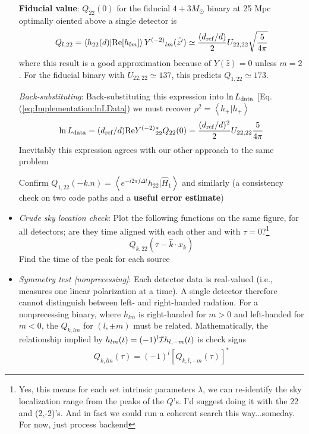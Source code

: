 \documentclass[twocolumn,prd,nofootinbib]{revtex4}
\newcommand\editremark[1]{{\color{red} #1}}
\newcommand\Y[1]{Y^{(#1)}{}}
\newcommand\qmstateproduct[2]{\left\langle#1|#2\right\rangle}
\begin{document}
\begin{widetext}
\begin{itemize}
\begin{shaded}
\noindent \textbf{Fiducial value}: $Q_{22}(0)$ for the fiducial $4+3 M_\odot$ binary at 25 Mpc optimally oiented above a
single detector is
 \begin{eqnarray}
 Q_{l,22} = \qmstateproduct{h_{22}(d)}{\text{Re}[h_{lm}]}\Y{-2}_{lm}(\hat{z'}) 
\simeq  \frac{(d_{\rm ref}/d)}{2}  U_{22,22} \sqrt{ \frac{5}{4\pi}}
 \end{eqnarray}
where this result is a good approximation because of $Y(\hat{z})=0$ unless $m=2$. For the fiducial binary with
$U_{22,22}\simeq 137$, this predicts $Q_{1,22}\simeq 173$.

\noindent \emph{Back-substituting}: Back-substituting this expression into $\ln L_{\rm data}$
          [Eq. (\ref{eq:Implementation:lnLData}) we must recover $\rho^2 = \qmstateproduct{h_+}{h_+}$
\begin{eqnarray}
\ln L_{\rm data} = (d_{\rm ref}/d) \text{Re} \Y{-2}_{22}^* Q_{22}(0) = \frac{(d_{\rm ref}/d)^2}{2} U_{22,22} \frac{5}{4\pi}
\end{eqnarray}
Inevitably this expression agrees with our other approach to the same problem
\end{shaded}



Confirm $Q_{1,22}(-k.n) = \qmstateproduct{e^{-i2\pi f \Delta t}h_{22}}{\hat{H}_1}$ and similarly (a consistency check on
two code paths and a \textbf{useful error estimate})


\item \emph{Crude sky location check}: Plot the following functions on the same figure, for all detectors; are they time
  aligned with each other and with $\tau=0$?\footnote{Yes, this means for each set intrinsic parameters $\lambda$, we
    can re-identify the sky localization range from the peaks of the $Q$'s.  I'd suggest doing it with the 22 and
    (2,-2)'s.  And in fact we could run a coherent search this way...someday. For now, just process backend}
\[
Q_{k,22}(\tau-\hat{k}\cdot x_k)
\]
Find the time of the peak for each source

\item \emph{Symmetry test [nonprecessing]}: Each detector data is real-valued (i.e., measures one linear polarization at
  a time).   A single detector therefore cannot distinguish between left- and right-handed radation.  For a
  nonprecessing binary, where $h_{lm}$ is right-handed for $m>0$ and left-handed for $m<0$, the $Q_{k,lm}$ for  $(l,\pm
  m)$  must be related.  Mathematically, the relationship implied by $h_{lm}(t) = (-1)^l{\cal I}h_{l,-m}(t)$ is    \editremark{check signs}
\begin{eqnarray}
Q_{k,lm}(\tau) = (-1)^l [Q_{k,l,-m}(\tau)]^*
\end{eqnarray}



\end{itemize}
\end{widetext}
\end{document}
